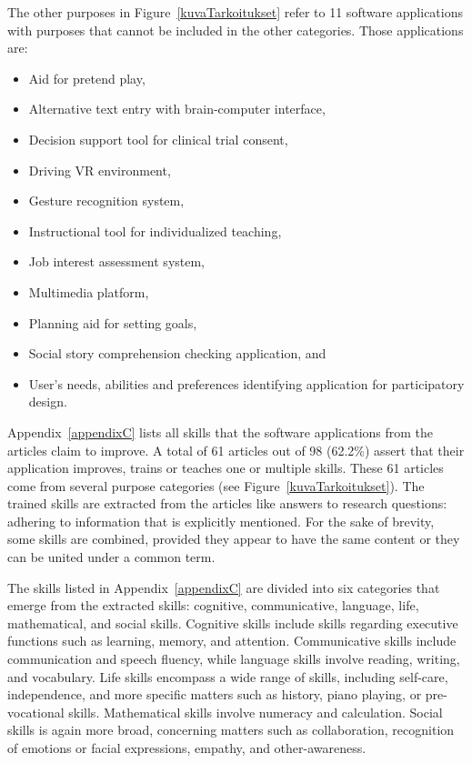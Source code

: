 \documentclass[utf8,english]{gradu3}
\begin{document}
The other purposes in Figure~\ref{kuvaTarkoitukset} refer to 11
software applications with purposes that cannot be included in the other categories.
Those applications are:
\begin{itemize}
  \item Aid for pretend play,
  \item Alternative text entry with brain-computer interface,
  \item Decision support tool for clinical trial consent,
  \item Driving VR environment,
  \item Gesture recognition system,
  \item Instructional tool for individualized teaching,
  \item Job interest assessment system,
  \item Multimedia platform,
  \item Planning aid for setting goals,
  \item Social story comprehension checking application, and
  \item User's needs, abilities and preferences identifying application for participatory design.
\end{itemize}

Appendix~\ref{appendixC} lists all skills that the software applications from the articles claim to improve.
A total of 61 articles out of 98 (62.2\%) assert that their application improves, trains or teaches one or multiple skills.
These 61 articles come from several purpose categories (see Figure~\ref{kuvaTarkoitukset}).
The trained skills are extracted from the articles like answers to research questions:
adhering to information that is explicitly mentioned.
For the sake of brevity, some skills are combined, provided they appear to have the same content
or they can be united under a common term.

The skills listed in Appendix~\ref{appendixC} are divided into six categories
that emerge from the extracted skills:
cognitive, communicative, language, life, mathematical, and social skills.
Cognitive skills include skills regarding executive functions such as learning, memory, and attention.
Communicative skills include communication and speech fluency, while
language skills involve reading, writing, and vocabulary.
Life skills encompass a wide range of skills, including self-care, independence,
and more specific matters such as history, piano playing, or pre-vocational skills.
Mathematical skills involve numeracy and calculation.
Social skills is again more broad, concerning matters such as collaboration,
recognition of emotions or facial expressions,
empathy, and other-awareness.
\end{document}
